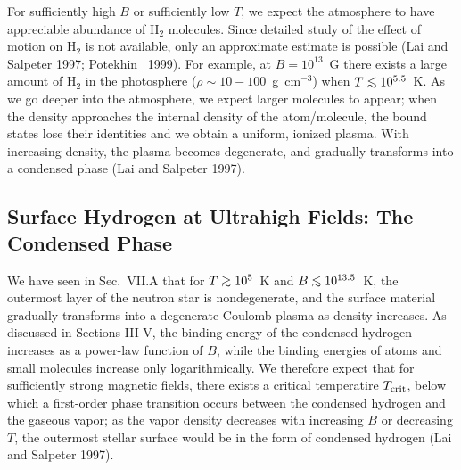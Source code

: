 For sufficiently high $B$ or sufficiently low $T$, we expect the 
atmosphere to have appreciable abundance of H$_2$ molecules. 
Since detailed study of the effect of motion on H$_2$ is not available,
only an approximate estimate is possible (Lai and Salpeter 1997; 
Potekhin \etal~1999). For example, at $B=10^{13}$~G there exists
a large amount of H$_2$ in the photosphere ($\rho\sim 10-100$~g~cm$^{-3}$)
when $T\lo 10^{5.5}$~K. As we go deeper into the atmosphere,
we expect larger molecules to appear; when the density approaches
the internal density of the atom/molecule, the bound states lose
their identities and we obtain a uniform, ionized plasma.
With increasing density, the plasma becomes degenerate, and
gradually transforms into a condensed phase
(Lai and Salpeter 1997).

\subsection{Surface Hydrogen at Ultrahigh Fields: The Condensed Phase}

We have seen in Sec.~VII.A that for $T\go 10^5$~K and $B\lo 10^{13.5}$~K, 
the outermost layer of the neutron star is nondegenerate, and the surface
material gradually transforms into a degenerate Coulomb plasma as density
increases. As discussed in Sections III-V, the binding energy of the condensed
hydrogen increases as a power-law function of $B$, while the binding energies
of atoms and small molecules increase only logarithmically. 
We therefore expect that for sufficiently strong magnetic fields, there exists
a critical temperatire $T_{\rm crit}$, below which a first-order phase 
transition occurs between the condensed hydrogen and the gaseous vapor;
as the vapor density decreases with increasing $B$ or decreasing $T$,
the outermost stellar surface would be in the form of condensed hydrogen
(Lai and Salpeter 1997). 

